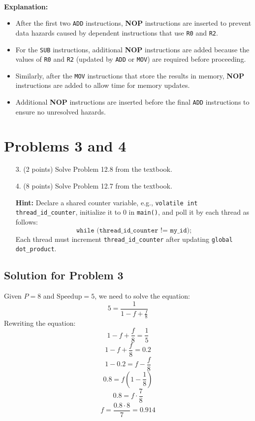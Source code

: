 \documentclass{article}
\begin{document}
\textbf{\\Explanation:}
\begin{itemize}
    \item After the first two \texttt{ADD} instructions, \textbf{NOP} instructions are inserted to prevent data hazards caused by dependent instructions that use \texttt{R0} and \texttt{R2}.
    \item For the \texttt{SUB} instructions, additional \textbf{NOP} instructions are added because the values of \texttt{R0} and \texttt{R2} (updated by \texttt{ADD} or \texttt{MOV}) are required before proceeding.
    \item Similarly, after the \texttt{MOV} instructions that store the results in memory, \textbf{NOP} instructions are added to allow time for memory updates.
    \item Additional \textbf{NOP} instructions are inserted before the final \texttt{ADD} instructions to ensure no unresolved hazards.
\end{itemize}

\section*{Problems 3 and 4}

\begin{enumerate}
    \item[3.] (2 points) Solve Problem 12.8 from the textbook.
    \item[4.] (8 points) Solve Problem 12.7 from the textbook. 

    \textbf{Hint:} Declare a shared counter variable, e.g., \texttt{volatile int thread\_id\_counter}, initialize it to 0 in \texttt{main()}, and poll it by each thread as follows: 
    \[
    \texttt{while (thread\_id\_counter != my\_id);}
    \]
    Each thread must increment \texttt{thread\_id\_counter} after updating \texttt{global dot\_product}.
\end{enumerate}

\subsection*{Solution for Problem 3}

Given \( P = 8 \) and \( \text{Speedup} = 5 \), we need to solve the equation:
\[
5 = \frac{1}{1 - f + \frac{f}{8}}
\]
Rewriting the equation:
\[
1 - f + \frac{f}{8} = \frac{1}{5}
\]
\[
1 - f + \frac{f}{8} = 0.2
\]
\[
1 - 0.2 = f - \frac{f}{8}
\]
\[
0.8 = f \left(1 - \frac{1}{8}\right)
\]
\[
0.8 = f \cdot \frac{7}{8}
\]
\[
f = \frac{0.8 \cdot 8}{7} = 0.914
\]
\end{document}
